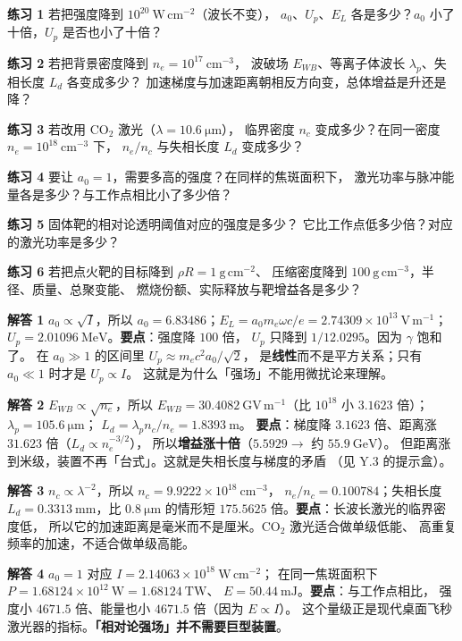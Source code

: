\textbf{练习 1} 若把强度降到 $10^{20}\ \mathrm{W\,cm^{-2}}$（波长不变），
$a_0$、$U_p$、$E_L$ 各是多少？$a_0$ 小了十倍，$U_p$ 是否也小了十倍？

\textbf{练习 2} 若把背景密度降到 $n_e = 10^{17}\ \mathrm{cm^{-3}}$，
波破场 $E_{WB}$、等离子体波长 $\lambda_p$、失相长度 $L_d$ 各变成多少？
加速梯度与加速距离朝相反方向变，总体增益是升还是降？

\textbf{练习 3} 若改用 $\mathrm{CO_2}$ 激光（$\lambda = 10.6\ \mathrm{\mu m}$），
临界密度 $n_c$ 变成多少？在同一密度 $n_e = 10^{18}\ \mathrm{cm^{-3}}$ 下，
$n_e/n_c$ 与失相长度 $L_d$ 变成多少？

\textbf{练习 4} 要让 $a_0 = 1$，需要多高的强度？在同样的焦斑面积下，
激光功率与脉冲能量各是多少？与工作点相比小了多少倍？

\textbf{练习 5} 固体靶的相对论透明阈值对应的强度是多少？
它比工作点低多少倍？对应的激光功率是多少？

\textbf{练习 6} 若把点火靶的目标降到 $\rho R = 1\ \mathrm{g\,cm^{-2}}$、
压缩密度降到 $100\ \mathrm{g\,cm^{-3}}$，半径、质量、总聚变能、
燃烧份额、实际释放与靶增益各是多少？

\textbf{解答 1} $a_0\propto\sqrt{I}$，所以
$a_0 = 6.83486$；$E_L = a_0 m_e\omega c/e = 2.74309\times10^{13}\ \mathrm{V\,m^{-1}}$；
$U_p = 2.01096\ \mathrm{MeV}$。\textbf{要点}：强度降 $100$ 倍，
$U_p$ 只降到 $1/12.0295$。因为 $\gamma$ 饱和了。
在 $a_0\gg1$ 的区间里 $U_p\approx m_ec^2a_0/\sqrt{2}$，
是\textbf{线性}而不是平方关系；只有 $a_0\ll1$ 时才是 $U_p\propto I$。
这就是为什么「强场」不能用微扰论来理解。

\textbf{解答 2} $E_{WB}\propto\sqrt{n_e}$，所以
$E_{WB} = 30.4082\ \mathrm{GV\,m^{-1}}$（比 $10^{18}$ 小 $3.1623$ 倍）；
$\lambda_p = 105.6\ \mathrm{\mu m}$；
$L_d = \lambda_p n_c/n_e = 1.8393\ \mathrm{m}$。
\textbf{要点}：梯度降 $3.1623$ 倍、距离涨 $31.623$ 倍（$L_d\propto n_e^{-3/2}$），
所以\textbf{增益涨十倍}（$5.5929\to$ 约 $55.9\ \mathrm{GeV}$）。
但距离涨到米级，装置不再「台式」。这就是失相长度与梯度的矛盾
（见 Y.3 的提示盒）。

\textbf{解答 3} $n_c\propto\lambda^{-2}$，所以
$n_c = 9.9222\times10^{18}\ \mathrm{cm^{-3}}$，
$n_e/n_c = 0.100784$；失相长度
$L_d = 0.3313\ \mathrm{mm}$，比 $0.8\ \mathrm{\mu m}$ 的情形短
$175.5625$ 倍。\textbf{要点}：长波长激光的临界密度低，
所以它的加速距离是毫米而不是厘米。$\mathrm{CO_2}$ 激光适合做单级低能、
高重复频率的加速，不适合做单级高能。

\textbf{解答 4} $a_0 = 1$ 对应
$I = 2.14063\times10^{18}\ \mathrm{W\,cm^{-2}}$；
在同一焦斑面积下 $P = 1.68124\times10^{12}\ \mathrm{W} = 1.68124\ \mathrm{TW}$、
$E = 50.44\ \mathrm{mJ}$。\textbf{要点}：与工作点相比，
强度小 $4671.5$ 倍、能量也小 $4671.5$ 倍（因为 $E\propto I$）。
这个量级正是现代桌面飞秒激光器的指标。\textbf{「相对论强场」并不需要巨型装置}。


